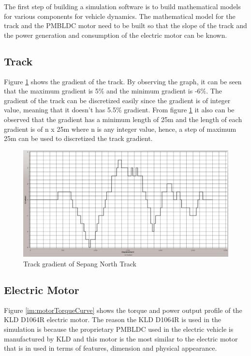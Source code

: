 The first step of building a simulation software is to build mathematical models for various components for vehicle dynamics. The mathematical model for the track and the PMBLDC motor need to be built so that the slope of the track and the power generation and consumption of the electric motor can be known.

\subsection{Track}
Figure \ref{im:trackGradient} shows the gradient of the track. By observing the graph, it can be seen that the maximum gradient is 5\% and the minimum gradient is -6\%. The gradient of the track can be discretized easily since the gradient is of integer value, meaning that it doesn't has 5.5\% gradient. From figure \ref{im:trackGradient} it also can be observed that the gradient has a minimum length of 25m and the length of each gradient is of n x 25m where n is any integer value, hence, a step of maximum 25m can be used to discretized the track gradient.

\begin{figure} [htb]
	\centering
	\includegraphics[width=6in]{images/track_gradient.jpg}
	\caption{Track gradient of Sepang North Track}
	\label{im:trackGradient}
\end{figure}

\subsection{Electric Motor}
Figure \ref{im:motorTorqueCurve} shows the torque and power output profile of the KLD D1064R electric motor. The reason the KLD D1064R is used in the simulation is because the proprietary PMBLDC used in the electric vehicle is manufactured by KLD and this motor is the most similar to the electric motor that is in used in terms of features, dimension and physical appearance. 

